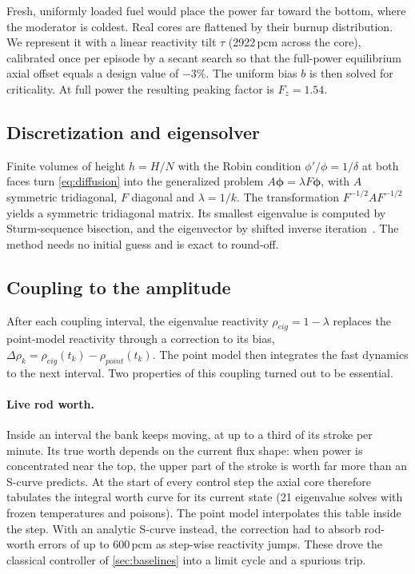 \documentclass[11pt,a4paper]{article}
\newcommand{\pcm}{\ensuremath{\,\mathrm{pcm}}}
\begin{document}
Fresh, uniformly loaded fuel would place the power far toward the bottom, where the
moderator is coldest. Real cores are flattened by their burnup distribution. We
represent it with a linear reactivity tilt $\tau$ (2922\pcm{} across the core),
calibrated once per episode by a secant search so that the full-power equilibrium
axial offset equals a design value of $-3\%$. The uniform bias $b$ is then solved
for criticality. At full power the resulting peaking factor is $F_z = 1.54$.

\subsection{Discretization and eigensolver}

Finite volumes of height $h = H/N$ with the Robin condition $\phi'/\phi = 1/\delta$ at
both faces turn \cref{eq:diffusion} into the generalized problem
$A\bm\phi = \lambda F\bm\phi$, with $A$ symmetric tridiagonal, $F$ diagonal and
$\lambda = 1/k$. The transformation $F^{-1/2}AF^{-1/2}$ yields a symmetric tridiagonal
matrix. Its smallest eigenvalue is computed by Sturm-sequence bisection, and the
eigenvector by shifted inverse iteration~\cite{parlett1998}. The method needs no
initial guess and is exact to round-off.

\subsection{Coupling to the amplitude}

After each coupling interval, the eigenvalue reactivity $\rho_{eig} = 1 - \lambda$
replaces the point-model reactivity through a correction to its bias,
$\Delta\rho_k = \rho_{eig}(t_k) - \rho_{point}(t_k)$. The point model then integrates
the fast dynamics to the next interval. Two properties of this coupling turned out to
be essential.

\paragraph{Live rod worth.} Inside an interval the bank keeps moving, at up to a third
of its stroke per minute. Its true worth depends on the current flux shape: when power
is concentrated near the top, the upper part of the stroke is worth far more than an
S-curve predicts. At the start of every control step the axial core therefore
tabulates the integral worth curve for its current state (21 eigenvalue solves with
frozen temperatures and poisons). The point model interpolates this table inside the
step. With an analytic S-curve instead, the correction had to absorb rod-worth errors
of up to 600\pcm{} as step-wise reactivity jumps. These drove the classical controller
of \cref{sec:baselines} into a limit cycle and a spurious trip.
\end{document}
